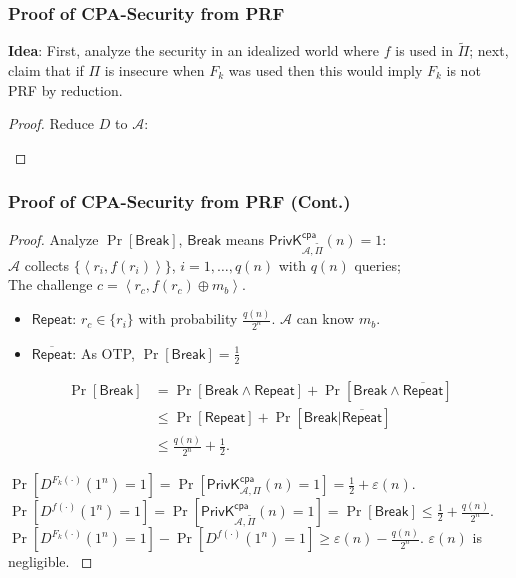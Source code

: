 \begin{frame}\frametitle{Proof of CPA-Security from PRF}
\textbf{Idea}: First, analyze the security in an idealized world where $f$ is used in $\tilde{\Pi}$; next, claim that if $\Pi$ is insecure when $F_k$ was used then this would imply $F_k$ is not PRF by reduction.
\begin{proof}
Reduce $D$ to $\mathcal{A}$:
\begin{figure}
\begin{center}

\end{center}
\end{figure}
\end{proof}
\end{frame}
\begin{frame}\frametitle{Proof of CPA-Security from PRF (Cont.)}
\begin{proof}
Analyze $\Pr[\mathsf{Break}]$, $\mathsf{Break}$ means $\mathsf{PrivK}_{\mathcal{A},\tilde{\Pi}}^{\mathsf{cpa}}(n) = 1$:  \\
$\mathcal{A}$ collects $\{ \left< r_i, f(r_i) \right> \}$, $i=1,\dots,q(n)$ with $q(n)$ queries; \\
The challenge $c=\left<r_c, f(r_c)\oplus m_b\right>$. \\
\begin{itemize}
\item $\mathsf{Repeat}$: $r_c \in \{ r_i \}$ with probability $\frac{q(n)}{2^n}$. $\mathcal{A}$ can know $m_b$.
\item $\overline{\mathsf{Repeat}}$: As OTP, $\Pr[\mathsf{Break}]=\frac{1}{2}$ 
\end{itemize}
\[
\begin{split}
	\Pr[\mathsf{Break}] & =\Pr[\mathsf{Break} \land \mathsf{Repeat}] + \Pr[\mathsf{Break} \land \overline{\mathsf{Repeat}}] \\
	&\le \Pr[\mathsf{Repeat}] + \Pr[\mathsf{Break} | \overline{\mathsf{Repeat}}] \\
	&\le \frac{q(n)}{2^n} + \frac{1}{2}.
\end{split}
\]

{\footnotesize 
$ \Pr[D^{F_k(\cdot)}(1^n)=1] = \Pr[\mathsf{PrivK}_{\mathcal{A},\Pi}^{\mathsf{cpa}}(n) = 1] = \frac{1}{2} + \varepsilon(n). $
$ \Pr[D^{f(\cdot)}(1^n)=1] = \Pr[\mathsf{PrivK}_{\mathcal{A},\tilde{\Pi}}^{\mathsf{cpa}}(n) = 1] = \Pr[\mathsf{Break}] \le \frac{1}{2} + \frac{q(n)}{2^n}. $
$\Pr[D^{F_k(\cdot)}(1^n)=1] - \Pr[D^{f(\cdot)}(1^n)=1] \ge \varepsilon(n) - \frac{q(n)}{2^n}.$
$\varepsilon(n)$ is negligible.
}
\end{proof}
\end{frame}
